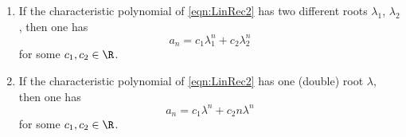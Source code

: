 

\setcounter{section}{1}
\setcounter{subsection}{2}
\setcounter{dfn}{4}

\begin{thm}
\begin{enumerate}
\item
If the characteristic polynomial of \eqref{eqn:LinRec2} has two different roots $\lambda_1$, $\lambda_2$,
then one has
\[
a_n = c_1 \lambda_1^n + c_2 \lambda_2^n
\]
for some $c_1, c_2 \in \R$.
\item
If the characteristic polynomial of \eqref{eqn:LinRec2} has one (double) root $\lambda$,
then one has
\[
a_n = c_1 \lambda^n + c_2 n \lambda^n
\]
for some $c_1, c_2 \in \R$.
\end{enumerate}
\end{thm}

